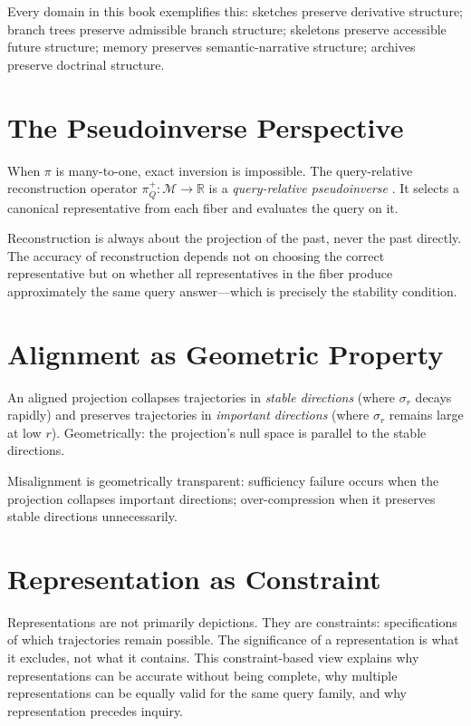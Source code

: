 Every domain in this book exemplifies this: sketches preserve derivative structure; branch trees preserve admissible branch structure; skeletons preserve accessible future structure; memory preserves semantic-narrative structure; archives preserve doctrinal structure.

\section{The Pseudoinverse Perspective}

When $\pi$ is many-to-one, exact inversion is impossible. The query-relative reconstruction operator $\pi^+_Q : \mathcal{M} \to \mathbb{R}$ is a \emph{query-relative pseudoinverse} \cite{Penrose1955,BenIsrael2003}. It selects a canonical representative from each fiber and evaluates the query on it.

Reconstruction is always about the projection of the past, never the past directly. The accuracy of reconstruction depends not on choosing the correct representative but on whether all representatives in the fiber produce approximately the same query answer---which is precisely the stability condition.

\section{Alignment as Geometric Property}

An aligned projection collapses trajectories in \emph{stable directions} (where $\sigma_r$ decays rapidly) and preserves trajectories in \emph{important directions} (where $\sigma_r$ remains large at low $r$). Geometrically: the projection's null space is parallel to the stable directions.

Misalignment is geometrically transparent: sufficiency failure occurs when the projection collapses important directions; over-compression when it preserves stable directions unnecessarily.

\section{Representation as Constraint}

Representations are not primarily depictions. They are constraints: specifications of which trajectories remain possible. The significance of a representation is what it excludes, not what it contains. This constraint-based view explains why representations can be accurate without being complete, why multiple representations can be equally valid for the same query family, and why representation precedes inquiry.

